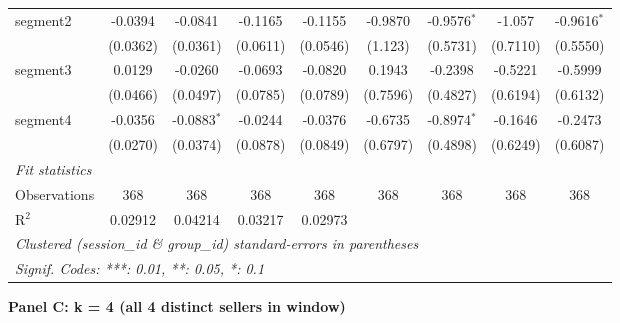 \begin{tabular}{lcccccccc}
   segment2               & -0.0394       & -0.0841         & -0.1165       & -0.1155       & -0.9870        & -0.9576$^{*}$   & -1.057         & -0.9616$^{*}$\\   
                          & (0.0362)      & (0.0361)        & (0.0611)      & (0.0546)      & (1.123)        & (0.5731)        & (0.7110)       & (0.5550)\\   
   segment3               & 0.0129        & -0.0260         & -0.0693       & -0.0820       & 0.1943         & -0.2398         & -0.5221        & -0.5999\\   
                          & (0.0466)      & (0.0497)        & (0.0785)      & (0.0789)      & (0.7596)       & (0.4827)        & (0.6194)       & (0.6132)\\   
   segment4               & -0.0356       & -0.0883$^{*}$   & -0.0244       & -0.0376       & -0.6735        & -0.8974$^{*}$   & -0.1646        & -0.2473\\   
                          & (0.0270)      & (0.0374)        & (0.0878)      & (0.0849)      & (0.6797)       & (0.4898)        & (0.6249)       & (0.6087)\\   
   \midrule
   \emph{Fit statistics}\\
   Observations           & 368           & 368             & 368           & 368           & 368            & 368             & 368            & 368\\  
   R$^2$                  & 0.02912       & 0.04214         & 0.03217       & 0.02973       &                &                 &                & \\  
   \midrule \midrule
   \multicolumn{9}{l}{\emph{Clustered (session\_id \& group\_id) standard-errors in parentheses}}\\
   \multicolumn{9}{l}{\emph{Signif. Codes: ***: 0.01, **: 0.05, *: 0.1}}\\
\end{tabular}
\par\endgroup
\medskip
\textbf{Panel C: k = 4 (all 4 distinct sellers in window)}\\
\begingroup
\centering
\scriptsize
